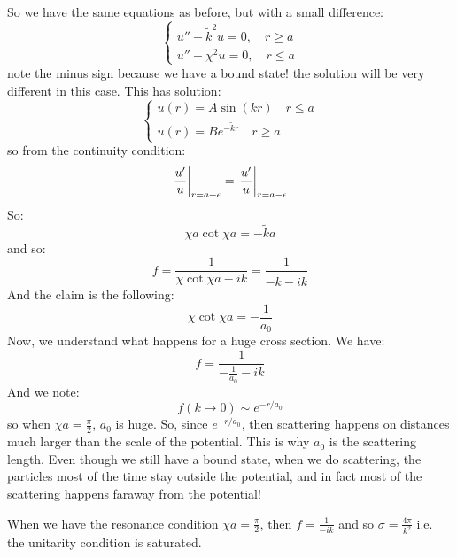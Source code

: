 So we have the same equations as before, but with a small difference:
\begin{equation}
    \begin{cases}
        u'' - \tilde{k}^2 u = 0, \quad r \geq a
        \\ u'' + \chi^2 u = 0, \quad r \leq a
    \end{cases}
\end{equation}
note the minus sign because we have a bound state! the solution will be very different in this case. This has solution:
\begin{equation}
    \begin{cases}
        u(r) = A\sin(kr) \quad r \leq a
        \\ u(r) = B e^{-\tilde{k}r}\quad r \geq a
    \end{cases}
\end{equation}
so from the continuity condition:
\begin{equation}
    \left. \frac{u'}{u}\right|_{r = a + \epsilon} = \left. \frac{u'}{u}\right|_{r = a - \epsilon}
\end{equation}
So:
\begin{equation}
    \chi a \cot \chi a = -\tilde{k}a
\end{equation}
and so:
\begin{equation}
    f = \frac{1}{\chi \cot \chi a - i k} = \frac{1}{-\tilde{k} - ik}
\end{equation}
And the claim is the following:
\begin{equation}
    \chi \cot \chi a = -\frac{1}{a_0}
\end{equation}
Now, we understand what happens for a huge cross section. We have:
\begin{equation}
    f = \frac{1}{-\frac{1}{a_0} - ik}
\end{equation}
And we note:
\begin{equation}
    f(k \to 0) \sim e^{-r/a_0}
\end{equation}
so when $\chi a= \frac{\pi}{2}$, $a_0$ is huge. So, since $e^{-r/a_0}$, then scattering happens on distances much larger than the scale of the potential. This is why $a_0$ is the scattering length. Even though we still have a bound state, when we do scattering, the particles most of the time stay outside the potential, and in fact most of the scattering happens faraway from the potential!

When we have the resonance condition $\chi a = \frac{\pi}{2}$, then $f = \frac{1}{-ik}$ and so $\sigma = \frac{4\pi}{k^2}$ i.e. the unitarity condition is saturated. 


